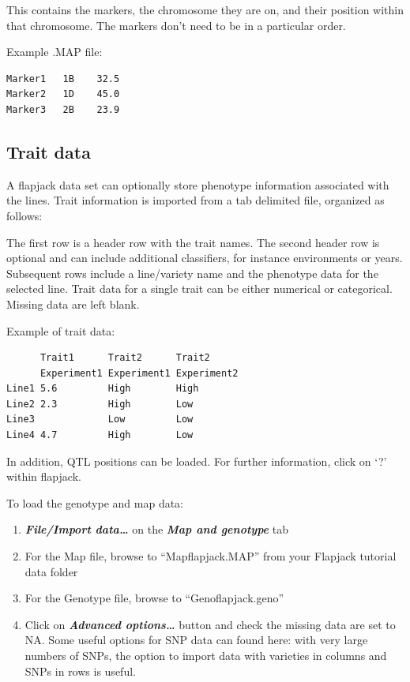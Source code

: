\documentclass[
]{book}
\providecommand{\tightlist}{%
  \setlength{\itemsep}{0pt}\setlength{\parskip}{0pt}}
\begin{document}
This contains the markers, the chromosome they are on, and their position within that chromosome. The markers don't need to be in a particular order.

Example .MAP file:

\begin{verbatim}
Marker1   1B    32.5
Marker2   1D    45.0
Marker3   2B    23.9
\end{verbatim}

\hypertarget{trait-data}{%
\subsection{Trait data}\label{trait-data}}

A flapjack data set can optionally store phenotype information associated with the lines. Trait information is imported from a tab delimited file, organized as follows:

The first row is a header row with the trait names. The second header row is optional and can include additional classifiers, for instance environments or years. Subsequent rows include a line/variety name and the phenotype data for the selected line. Trait data for a single trait can be either numerical or categorical. Missing data are left blank.

Example of trait data:

\begin{verbatim}
      Trait1      Trait2      Trait2
      Experiment1 Experiment1 Experiment2
Line1 5.6         High        High
Line2 2.3         High        Low
Line3             Low         Low
Line4 4.7         High        Low
\end{verbatim}

In addition, QTL positions can be loaded. For further information, click on `?' within flapjack.

To load the genotype and map data:

\begin{enumerate}
\def\labelenumi{\arabic{enumi}.}
\tightlist
\item
  \textbf{\emph{File/Import data\ldots{}}} on the \textbf{\emph{Map and genotype}} tab
\item
  For the Map file, browse to ``Mapflapjack.MAP'' from your Flapjack tutorial data folder
\item
  For the Genotype file, browse to ``Genoflapjack.geno''
\item
  Click on \textbf{\emph{Advanced options\ldots{}}} button and check the missing data are set to NA. Some useful options for SNP data can found here: with very large numbers of SNPs, the option to import data with varieties in columns and SNPs in rows is useful.
\end{enumerate}
\end{document}
